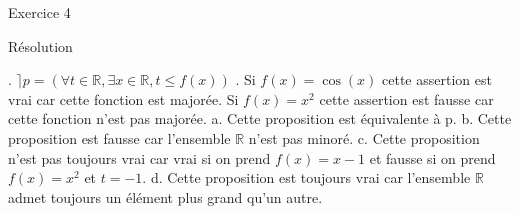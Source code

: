 \hypertarget{Exercice_4}{
\Huge{\begin{center}Exercice 4\end{center} \leavevmode\newline }}

\hypertarget{resolution}{%
\LARGE{Résolution}\label{resolution}}
\newline
{}. $\rceil p = (\forall t\in \mathbb{R}, \exists x \in \mathbb{R}, t \leq f(x))$
\newline
{}. Si $f(x) = \cos (x)$ cette assertion est vrai car cette fonction est majorée.
\newline
Si $f(x) = x^2$ cette assertion est fausse car cette fonction n'est pas majorée.
\newline
{}
\newline
\newline
a. Cette proposition est équivalente à p.
\newline
\newline
b. Cette proposition est fausse car l'ensemble $\mathbb{R}$ n'est pas minoré.
\newline
\newline
c. Cette proposition n'est pas toujours vrai car vrai si on prend $f(x) = x-1$ et fausse si on prend $f(x) = x^2$ et $t=-1$.
\newline
\newline
d. Cette proposition est toujours vrai car l'ensemble $\mathbb{R}$ admet toujours un élément plus grand qu'un autre.
